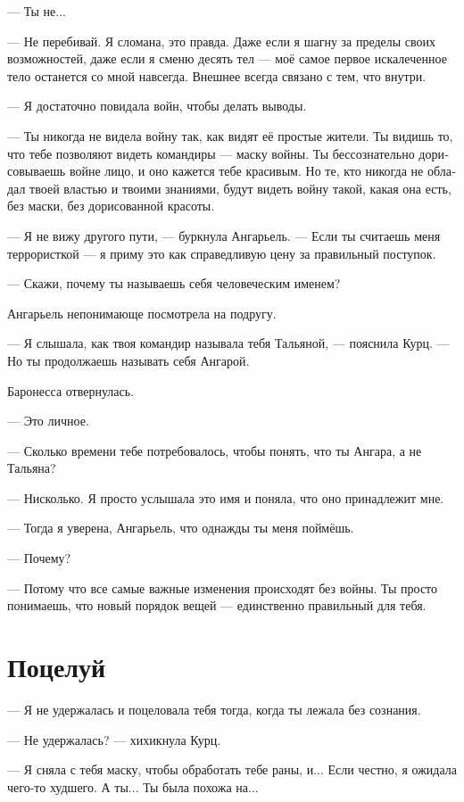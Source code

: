 \documentclass[a4paper,12pt,fleqn]{book}\usepackage{cooltooltips}\usepackage{polyglossia}\setdefaultlanguage[babelshorthands=true]{russian}\setotherlanguage{english}\defaultfontfeatures{Ligatures=TeX,Mapping=tex-text} \usepackage{xcolor}\definecolor{lightgray}{HTML}{bbbbbb}\color{lightgray}\newcommand{\ml}[3]{\textenglish{\textcolor{black}{#3}}}
\begin{document}
--- Ты не...

--- Не перебивай.
Я сломана, это правда.
Даже если я шагну за пределы своих возможностей, даже если я сменю десять тел --- моё самое первое искалеченное тело останется со мной навсегда.
Внешнее всегда связано с тем, что внутри.

--- Я достаточно повидала войн, чтобы делать выводы.

--- Ты никогда не видела войну так, как видят её простые жители.
Ты видишь то, что тебе позволяют видеть командиры --- маску войны.
Ты бессознательно дорисовываешь войне лицо, и оно кажется тебе красивым.
Но те, кто никогда не обладал твоей властью и твоими знаниями, будут видеть войну такой, какая она есть, без маски, без дорисованной красоты.

--- Я не вижу другого пути, --- буркнула Ангарьель.
--- Если ты считаешь меня террористкой --- я приму это как справедливую цену за правильный поступок.

--- Скажи, почему ты называешь себя человеческим именем?

Ангарьель непонимающе посмотрела на подругу.

--- Я слышала, как твоя командир называла тебя Тальяной, --- пояснила Курц.
--- Но ты продолжаешь называть себя Ангарой.

Баронесса отвернулась.

--- Это личное.

--- Сколько времени тебе потребовалось, чтобы понять, что ты Ангара, а не Тальяна?

--- Нисколько.
Я просто услышала это имя и поняла, что оно принадлежит мне.

--- Тогда я уверена, Ангарьель, что однажды ты меня поймёшь.

--- Почему?

--- Потому что все самые важные изменения происходят без войны.
Ты просто понимаешь, что новый порядок вещей --- единственно правильный для тебя.

\section{Поцелуй}

--- Я не удержалась и поцеловала тебя тогда, когда ты лежала без сознания.

--- Не удержалась? --- хихикнула Курц.

--- Я сняла с тебя маску, чтобы обработать тебе раны, и...
Если честно, я ожидала чего-то худшего.
А ты...
Ты была похожа на...
\end{document}
